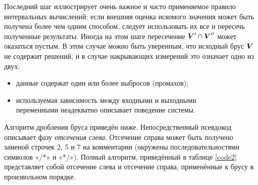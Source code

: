 \documentclass[a5paper,openany]{book}
\newcommand{\mbf}[1]{\protect\text{\boldmath$#1$}}
\begin{document}
Последний шаг иллюстрирует очень важное и часто применяемое правило интервальных 
вычислений: если внешняя оценка искомого значения может быть получена более чем одним 
способом, следует использовать их все и пересечь полученные результаты. Иногда на этом 
шаге пересечение $\mbf{V}' \cap\mbf{V}''$ может оказаться пустым. В этом случае можно  
быть уверенным, что исходный брус $\mbf{V}$ не содержит решений, и в случае накрывающих 
измерений это означает одно из двух: 
\begin{itemize}
\item  данные содержат один или более выбросов (промахов); 
\item  используемая зависимость между входными и выходными \\ 
       переменными неадекватно описывает поведение системы.
\end{itemize}

Алгоритм дробления бруса приведён ниже. Непосредственный псевдокод описывает фазу 
\emph{отсечения слева}. Отсечение справа может быть получено заменой строчек 2, 5 и 7 
на комментарии (окружены последовательностями символов «/*» и «*/»). Полный алгоритм, 
приведённый в таблице \ref{code2} представляет собой отсечение слева и отсечение 
справа, применённые к брусу в произвольном порядке. 
  
  
\end{document}
